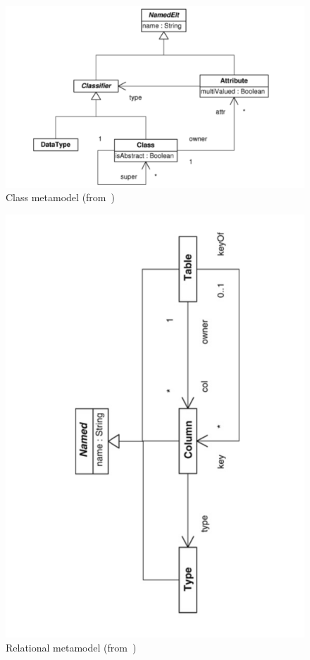 \documentclass{llncs}
\begin{document}
\begin{figure}
	\centering
	\includegraphics[width=1\textwidth,natwidth=610,natheight=642]{figures/Class_metamodel.pdf}
	\caption{Class metamodel (from~\cite{atl:frederic})}
	\label{fig:class_metamodel_atl}
\end{figure}

\begin{figure}
	\centering
	\includegraphics[angle=270,width=1\textwidth,natwidth=610,natheight=642]{figures/Relational_metamodel.pdf}
	\caption{Relational metamodel (from~\cite{atl:frederic})}
	\label{fig:relational_metamodel_atl}
\end{figure}
\end{document}
